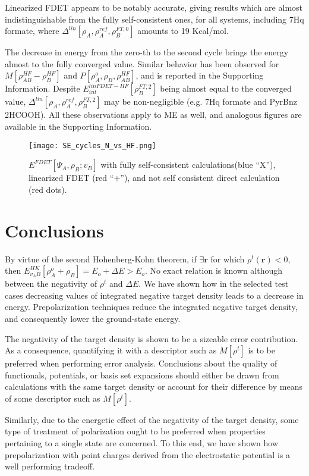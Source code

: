 \documentclass[journal=jctcce,manuscript=article, layout=twocolumn]{achemso}
\begin{document}
Linearized FDET appears to be notably accurate, giving results which are almost indistinguishable from the fully self-consistent ones, for all systems, including 7Hq formate, where $\Delta^{lin}[\rho_A,\rho_A^{ref},\rho_B^{FT,0}]$ amounts to 19 Kcal/mol. 

The decrease in energy from the zero-th to the second cycle brings the energy almost to the fully converged value. Similar behavior has been observed for $M[\rho^{HF}_{AB} - \rho^{HF}_{B}]$ and $P[\rho^{o}_A, \rho_B, \rho^{HF}_{AB}]$, and is reported in the Supporting Information. Despite $E^{linFDET-HF}_{int}[\rho_B^{FT,2}]$ being almost equal to the converged value, $\Delta^{lin}[\rho_A,\rho_A^{ref},\rho_B^{FT,2}]$ may be non-negligible (e.g. 7Hq formate and PyrBnz 2HCOOH). All these observations apply to ME as well, and analogous figures are available in the Supporting Information.

\begin{figure}[H]
\centering
\texttt{[image: SE\_cycles\_N\_vs\_HF.png]}
\caption{$E^{FDET}[\Psi_A,\rho_B; v_B]$ with fully self-consistent calculations(blue ``X''), linearized FDET (red ``+''), and not self consistent direct calculation (red dots).}
\label{fig:N_vs_HF_SE}
\end{figure}

\section{Conclusions}
By virtue of the second Hohenberg-Kohn theorem, if $\exists \mathbf{r}$ for which $\rho^t(\mathbf{r}) < 0$, then $E^{HK}_{v_AB}[\rho_A^o + \rho_B] = E_o + \Delta E > E_o$.
No exact relation is known although between the negativity of $\rho^t$ and $\Delta E$.
We have shown how in the selected test cases decreasing values of integrated negative target density leads to a decrease in energy.
Prepolarization techniques reduce the integrated negative target density, and consequently lower the ground-state energy.

The negativity of the target density is shown to be a sizeable error contribution. As a consequence, quantifying it with a descriptor such as $M[\rho^t]$ is to be preferred when performing error analysis. Conclusions about the quality of functionals, potentials, or basis set expansions should either be drawn from calculations with the same target density or account for their difference by means of some descriptor such as $M[\rho^t]$.

Similarly, due to the energetic effect of the negativity of the target density, some type of treatment of polarization ought to be preferred when properties pertaining to a single state are concerned.
To this end, we have shown how prepolarization with point charges derived from the electrostatic potential is a well performing tradeoff.
\end{document}
